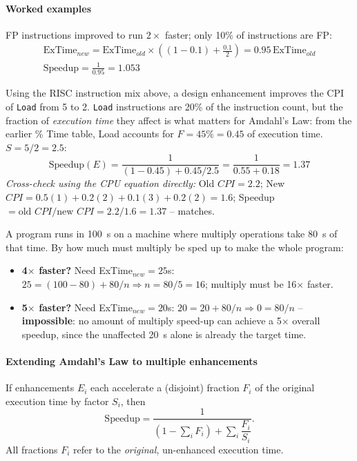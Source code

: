 \paragraph{Worked examples}

\begin{eg}
FP instructions improved to run $2\times$ faster; only 10\% of instructions
are FP:
\begin{gather*}
  \text{ExTime}_{new} = \text{ExTime}_{old}\times\left((1-0.1) +
  \frac{0.1}{2}\right) = 0.95\,\text{ExTime}_{old}\\
  \text{Speedup} = \frac{1}{0.95} = 1.053
\end{gather*}
\end{eg}

\begin{eg}
Using the RISC instruction mix above, a design enhancement improves the CPI of \texttt{Load} from 5 to 2.
\texttt{Load} instructions are 20\% of the instruction count, but the
fraction of \emph{execution time} they affect is what matters for Amdahl's
Law: from the earlier \% Time table, Load accounts for $F=45\% = 0.45$ of
execution time. $S = 5/2 = 2.5$:
\[
  \text{Speedup}(E) = \frac{1}{(1-0.45) + 0.45/2.5} = \frac{1}{0.55+0.18}
  = 1.37
\]
\emph{Cross-check using the CPU equation directly:} Old $CPI = 2.2$; New
$CPI = 0.5(1) + 0.2(2) + 0.1(3) + 0.2(2) = 1.6$;
Speedup $= \text{old }CPI / \text{new }CPI = 2.2/1.6 = 1.37$ -- matches.
\end{eg}

\begin{eg}
A program runs in 100~s on a machine where multiply operations take 80~s of
that time. By how much must multiply be sped up to make the whole program:
\begin{itemize}
  \item \textbf{4$\times$ faster?} Need ExTime$_{new}=25$s:
  $25 = (100-80) + 80/n \Rightarrow n = 80/5 = 16$; multiply must be
  16$\times$ faster.
  \item \textbf{5$\times$ faster?} Need ExTime$_{new}=20$s:
  $20 = 20 + 80/n \Rightarrow 0 = 80/n$ -- \textbf{impossible}: no amount of
  multiply speed-up can achieve a 5$\times$ overall speedup, since the
  unaffected 20~s alone is already the target time.
\end{itemize}
\end{eg}

\paragraph{Extending Amdahl's Law to multiple enhancements}
\begin{corollary}
If enhancements $E_i$ each accelerate a (disjoint) fraction $F_i$ of the
original execution time by factor $S_i$, then
\[
  \text{Speedup} = \frac{1}{\left(1-\sum_i F_i\right) + \sum_i \dfrac{F_i}{S_i}}.
\]
All fractions $F_i$ refer to the \emph{original}, un-enhanced execution time.
\end{corollary}

